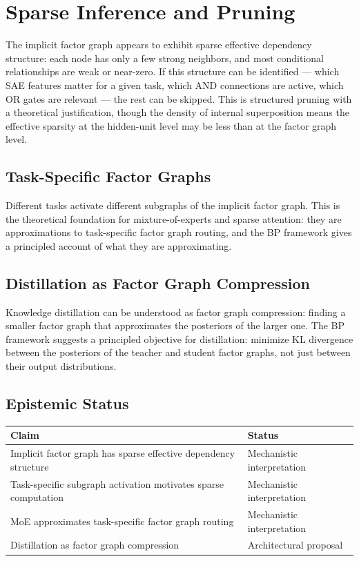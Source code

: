 \section{Sparse Inference and Pruning}
\label{sec:efficiency}

The implicit factor graph appears to exhibit sparse effective dependency
structure: each node has only a few strong neighbors, and most conditional
relationships are weak or near-zero. If this structure can be identified
--- which SAE features matter for a given task, which AND connections are
active, which OR gates are relevant --- the rest can be skipped. This is
structured pruning with a theoretical justification, though the density
of internal superposition means the effective sparsity at the hidden-unit
level may be less than at the factor graph level.

\subsection*{Task-Specific Factor Graphs}

Different tasks activate different subgraphs of the implicit factor graph.
This is the theoretical foundation for mixture-of-experts and sparse
attention: they are approximations to task-specific factor graph routing,
and the BP framework gives a principled account of what they are
approximating.

\subsection*{Distillation as Factor Graph Compression}

Knowledge distillation can be understood as factor graph compression:
finding a smaller factor graph that approximates the posteriors of the
larger one. The BP framework suggests a principled objective for
distillation: minimize KL divergence between the posteriors of the teacher
and student factor graphs, not just between their output distributions.

\subsection*{Epistemic Status}

\begin{center}
\begin{tabular}{ll}
\toprule
Claim & Status \\
\midrule
Implicit factor graph has sparse effective dependency structure & Mechanistic interpretation \\
Task-specific subgraph activation motivates sparse computation & Mechanistic interpretation \\
MoE approximates task-specific factor graph routing & Mechanistic interpretation \\
Distillation as factor graph compression & Architectural proposal \\
\bottomrule
\end{tabular}
\end{center}